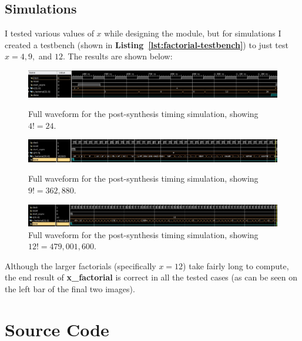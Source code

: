 \documentclass[a4paper, 12pt]{article}
\begin{document}
\begin{landscape}
\section{Simulations}
I tested various values of $x$ while designing the module, but for simulations I created a testbench (shown in \textbf{Listing~\ref{lst:factorial-testbench}}) to just test $x=4, 9, $ and $12$. The results are shown below:

\begin{figure}[H]
\centering
\includegraphics[width=0.80\paperheight, keepaspectratio=true]{Sources/post-synth-time-4.jpg}
\caption{Full waveform for the post-synthesis timing simulation, showing $4!=24$.}
\label{fig:behav-codon-reader}
\includegraphics[width=0.80\paperheight, keepaspectratio=true]{Sources/post-synth-time-9.jpg}
\caption{Full waveform for the post-synthesis timing simulation, showing $9!=362,880$.}
\label{fig:behav-codon-reader}
\includegraphics[width=0.80\paperheight, keepaspectratio=true]{Sources/post-synth-time-12.jpg}
\caption{Full waveform for the post-synthesis timing simulation, showing $12!=479,001,600$.}
\label{fig:behav-codon-reader}
\end{figure}

Although the larger factorials (specifically $x=12$) take fairly long to compute, the end result of \textbf{x\_factorial} is correct in all the tested cases (as can be seen on the left bar of the final two images).
\end{landscape}

\section{Source Code}
\begin{mdframed}[backgroundcolor=code-gray, roundcorner=10pt, innerleftmargin=25, innertopmargin=5, innerbottommargin=5]	

\end{mdframed}

\begin{mdframed}[backgroundcolor=code-gray, roundcorner=10pt, innerleftmargin=25, innertopmargin=5, innerbottommargin=5]	

\end{mdframed}
\end{document}
